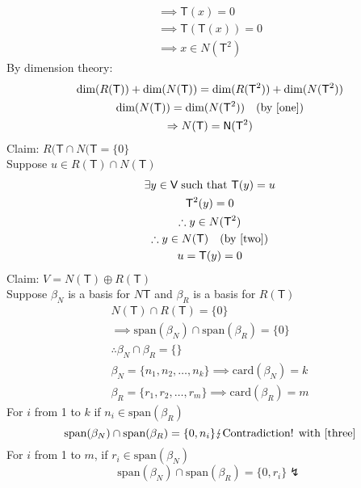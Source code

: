 \begin{enumerate}[(a)]
\begin{gather}
\implies \mathsf{T}(x) = 0 \\
\implies \mathsf{T}(\mathsf{T}(x)) = 0\\
\implies x \in N(\mathsf{T}^2)
\end{gather}
By dimension theory:
\begin{gather}
\text{dim}(R(\mathsf{T})) + \text{dim}(N(\mathsf{T})) =
\text{dim}(R(\mathsf{T}^2)) + \text{dim}(N(\mathsf{T}^2))\\
\text{dim}(N(\mathsf{T})) = \text{dim}(N(\mathsf{T}^2)) \quad
(\text{by \ref{one}})\\
\implies N(\mathsf{T}) = \mathsf{N}(\mathsf{T}^2) \label{two}
\end{gather}
Claim: $R(\mathsf{T}\cap N(\mathsf{T} = \{0\}$
\\Suppose $u \in R(\mathsf{T}) \cap N(\mathsf{T})$
\begin{gather}
\exists y \in \mathsf{V}\; \text{such that } \mathsf{T}(y) = u\\
\mathsf{T}^2(y) = 0 \\
\therefore y \in N(\mathsf{T}^2)\\
\therefore y \in N(\mathsf{T}) \quad (\text{by \ref{two}})\\
u = \mathsf{T}(y) = 0
\end{gather}
Claim: $V = N(\mathsf{T}) \oplus R(\mathsf{T})$
\\Suppose $\beta_N$ is a basis for $N\mathsf{T}$ and $\beta_R$ is a
basis for $R(\mathsf{T})$
\begin{gather}
N(\mathsf{T}) \cap R(\mathsf{T}) =\{0\}\\
\implies \text{span}(\beta_N)\cap \text{span}(\beta_R)
=\{0\} \label{three}\\
\therefore \beta_N\cap \beta_R = \{\}\\
\beta_N =\{n_1,n_2,\dotsc,n_k\} \implies \text{card}(\beta_N) = k\\
\beta_R =\{r_1,r_2,\dotsc,r_m\} \implies \text{card}(\beta_R) =m
\end{gather}
For $i$ from 1 to $k$ if $n_i \in \text{span}(\beta_R)$
\begin{equation}
\text{span}(\beta_N)\cap\text{span}(\beta_R) = \{0,n_i\} \lightning
\text{Contradiction! with \ref{three}} 
\end{equation}
For $i$ from 1 to $m$, if $r_i \in \text{span}(\beta_N)$
\begin{equation}
\text{span}(\beta_N)\cap\text{span}(\beta_R) = \{0,r_i\} \lightning

\end{equation}
\end{enumerate}
